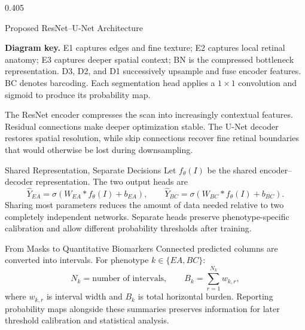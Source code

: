 \documentclass[final]{beamer}
\begin{document}
\begin{frame}[t]
\begin{columns}[t,totalwidth=\dimexpr\paperwidth-4cm\relax]
\begin{column}{0.405\textwidth}
\begin{block}{Proposed ResNet--U-Net Architecture}
{
    }

    \vspace{0.45cm}
    \justifying
    \textbf{Diagram key.} E1 captures edges and fine texture; E2 captures local
    retinal anatomy; E3 captures deeper spatial context; BN is the compressed
    bottleneck representation. D3, D2, and D1 successively upsample and fuse
    encoder features. BC denotes barcoding. Each segmentation head applies a
    $1\!\times\!1$ convolution and sigmoid to produce its probability map.

    \vspace{0.3cm}
    The ResNet encoder compresses the scan into increasingly contextual
    features. Residual connections make deeper optimization stable. The U-Net
    decoder restores spatial resolution, while skip connections recover fine
    retinal boundaries that would otherwise be lost during downsampling.
  \end{block}

  \begin{block}{Shared Representation, Separate Decisions}
    Let $f_\theta(I)$ be the shared encoder--decoder representation. The two
    output heads are
    \[
      \hat{Y}_{EA}=\sigma(W_{EA}*f_\theta(I)+b_{EA}),\qquad
      \hat{Y}_{BC}=\sigma(W_{BC}*f_\theta(I)+b_{BC}).
    \]
    Sharing most parameters reduces the amount of data needed relative to two
    completely independent networks. Separate heads preserve phenotype-specific
    calibration and allow different probability thresholds after training.
  \end{block}

  \begin{block}{From Masks to Quantitative Biomarkers}
    Connected predicted columns are converted into intervals. For phenotype
    $k\in\{EA,BC\}$:
    \[
      N_k=\text{number of intervals},\qquad
      B_k=\sum_{r=1}^{N_k} w_{k,r},
    \]
    where $w_{k,r}$ is interval width and $B_k$ is total horizontal burden.
    Reporting probability maps alongside these summaries preserves information
    for later threshold calibration and statistical analysis.
  \end{block}


\end{column}
\end{columns}
\end{frame}
\end{document}
